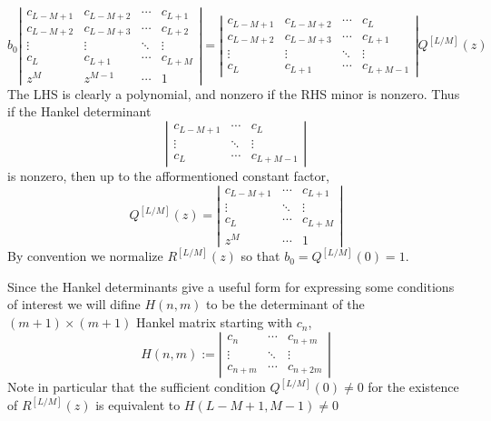 \documentclass{amsart}
\theoremstyle{remark}
\numberwithin{equation}{section}
\begin{document}
\[
    b_0
    \left|
    \begin{matrix}
        c_{L-M+1} & c_{L-M+2} & \cdots & c_{L+1} \\
        c_{L-M+2} & c_{L-M+3} & \cdots & c_{L+2} \\
        \vdots & \vdots & \ddots & \vdots \\
        c_{L} & c_{L+1} & \cdots & c_{L+M} \\
        z^M & z^{M-1} & \cdots & 1
    \end{matrix}
    \right|
    =
    \left|
    \begin{matrix}
        c_{L-M+1} & c_{L-M+2} & \cdots & c_L \\
        c_{L-M+2} & c_{L-M+3} & \cdots & c_{L+1} \\
        \vdots & \vdots & \ddots & \vdots  \\
        c_L & c_{L+1} & \cdots & c_{L+M-1} 
    \end{matrix}
    \right| 
    Q^{[L/M]}(z)
\]
The LHS is clearly a polynomial, and nonzero if the RHS minor is nonzero. Thus if the Hankel determinant
\[
    \left|
    \begin{matrix}
        c_{L-M+1} & \cdots & c_L \\
        \vdots & \ddots & \vdots  \\
        c_L & \cdots & c_{L+M-1} 
    \end{matrix}
    \right| 
\]
is nonzero, then up to the afformentioned constant factor,
\begin{equation}
    Q^{[L/M]}(z) = 
    \left|
    \begin{matrix}
        c_{L-M+1} & \cdots & c_{L+1} \\
        \vdots & \ddots & \vdots \\
        c_{L} & \cdots & c_{L+M} \\
        z^M & \cdots & 1
    \end{matrix}
    \right| 
    \label{eq:Qdet}
\end{equation}
By convention we normalize $R^{[L/M]}(z)$ so that $b_0 = Q^{[L/M]}(0) = 1$. 

Since the Hankel determinants give a useful form for expressing some conditions of interest we will difine $H(n,m)$ to be the determinant of the $(m + 1) \times (m + 1)$ Hankel matrix starting with $c_n$,
\[
    H(n,m) :=
    \left|
    \begin{matrix}
        c_{n} & \cdots & c_{n+m} \\
        \vdots & \ddots & \vdots  \\
        c_{n+m} & \cdots & c_{n+2m} 
    \end{matrix}
    \right|
\]
Note in particular that the sufficient condition $Q^{[L/M]}(0) \neq 0$ for the existence of $R^{[L/M]}(z)$ is equivalent to $H(L-M+1, M-1) \neq 0$
\end{document}
